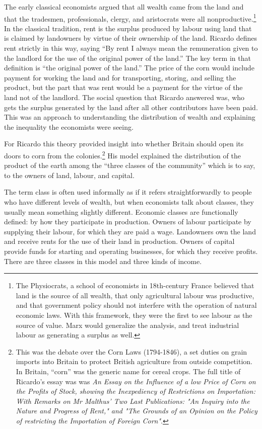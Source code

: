  
 The early classical economists argued that all wealth came from the land and that  the tradesmen, professionals, clergy, and aristocrats were all nonproductive.\footnote{The Physiocrats, a school of economists in 18th-century France believed that land is the source of all wealth, that only agricultural labour was productive, and that government policy should not interfere with the operation of natural economic laws. With this framework, they were the first to see labour as the  source of value. Marx would generalize the analysis, and treat industrial labour as generating a surplus as well.} In the classical tradition, rent is the surplus produced by labour using land that is claimed by landowners by virtue of their ownership of the land. Ricardo defines rent strictly in this way, saying ``By rent I always mean the remuneration given to the landlord for the use of the original power of the land.''\cite{ricardoEssayInfluenceLow1815} The key term in that definition is ``the original power of the land.'' The price of the corn would include payment for working the land and for transporting, storing, and  selling the product, but the part that was rent would be a payment for the virtue of the land not of the landlord. The social question that Ricardo answered was, who gets the surplus generated by the land after all other contributors have been paid. This was an approach to understanding the distribution of wealth and explaining the inequality the economists were seeing. 
 
 For Ricardo this theory provided insight into whether Britain should open its doors to corn from the colonies.\footnote{This was the debate over the Corn Laws (1794-1846), a set duties on grain imports into Britain to protect British agriculture from outside competition. In Britain, ``corn'' was the generic name for cereal crops. The full title of Ricardo's essay was was \textit{An Essay on the Influence of a low Price of Corn on the Profits of Stock, showing the Inexpediency of Restrictions on Importation: With Remarks on Mr Malthus' Two Last Publications: "An Inquiry into the Nature and Progress of Rent," and "The Grounds of an Opinion on the Policy of restricting the Importation of Foreign Corn"}.}
His model  explained the distribution of the product of the earth among the “three classes of the community” which is to say, to the owners of land, labour, and capital. 

The term \gls{class} is often used informally as if it refers straightforwardly to people who have different levels of wealth, but when economists talk about classes, they usually mean something slightly different. Economic classes are functionally defined:  by how they participate in production. Owners of labour participate by supplying their labour, for which they are paid a wage. Landowners own the land and receive rents for the use of their land in production. Owners of capital provide funds for starting and operating businesses, for which they receive profits.  There are three classes in this model and three kinds of income.  %

